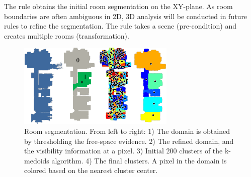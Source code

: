 The rule obtains the initial room
segmentation on the XY-plane. As room boundaries are often ambiguous
in 2D, 3D analysis will be conducted in future rules to refine the
segmentation. The rule takes a scene (pre-condition) and creates
multiple rooms (transformation).
%
%
%
%
\begin{figure}[!t]
\begin{center}
 \includegraphics[width=75mm]{../figures/k-medoids2.pdf}
\end{center}
\caption{Room segmentation. From left to right: 1) The domain is
 obtained by thresholding the free-space evidence. 2) The refined
 domain, and the visibility information at a pixel. 3) Initial 200 clusters
 of the k-medoids algorithm. 4) The final clusters. A pixel in the
 domain is colored based on the nearest cluster center.
 }
\label{fig:k-medoids}
 \vspace{-0.325cm}
\end{figure}



